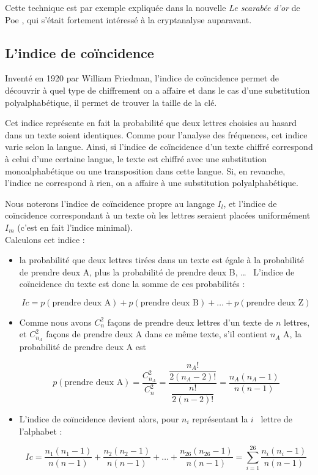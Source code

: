 Cette technique est par exemple expliquée dans la nouvelle
\emph{Le scarabée d'or} de Poe \cite{Poe}, qui s'était fortement 
intéressé à la cryptanalyse auparavant.


\subsection{L'indice de coïncidence}
Inventé en 1920 par William Friedman, l'indice de coïncidence
permet de découvrir à quel type de chiffrement on a affaire 
et dans le cas d'une
substitution polyalphabétique, il permet de trouver la taille de
la clé.

Cet indice représente en fait la probabilité que deux lettres
choisies au hasard dans un texte soient identiques. Comme pour
l'analyse des fréquences, cet indice varie selon la langue.
Ainsi, si l'indice de coïncidence d'un texte chiffré correspond à
celui d'une certaine langue, le texte est chiffré avec une
substitution monoalphabétique ou une transposition dans cette 
langue. Si, en revanche, l'indice ne correspond à rien, on a affaire 
à une substitution polyalphabétique.

Nous noterons l'indice de coïncidence propre au langage $I_l$, et
l'indice de coïncidence correspondant à un texte où les lettres
seraient placées uniformément $I_m$ (c'est en fait l'indice
minimal). 
\\

Calculons cet indice :
\begin{itemize}
  \item la probabilité que deux lettres tirées dans un texte est
égale à la probabilité de prendre deux A, plus la probabilité de
prendre deux B, \dots~ L'indice de coïncidence du texte est donc la
somme de ces probabilités :
  \begin{center}
    \[ Ic = p(\mbox{prendre deux A}) + p(\mbox{prendre deux B}) +
\dots + p(\mbox{prendre deux Z}) \]
  \end{center}
  \item Comme nous avons $C_{n}^2$ façons de prendre deux lettres
d'un texte de $n$ lettres, et $C_{n_A}^2$ façons de prendre deux A
dans ce même texte, s'il contient $n_A$ A, la probabilité de prendre 
deux A est
  \begin{center}
    \[ p(\mbox{prendre deux A}) = \dfrac{C_{n_A}^2}{C_{n}^2} =
\dfrac{\dfrac{n_A!}{2 (n_A - 2)!}}{\dfrac{n!}{2 (n - 2)!}} = 
\dfrac{n_A (n_A - 1)}{n (n - 1)} \]
  \end{center}
  \item L'indice de coïncidence devient alors, pour $n_i$
représentant la $i$\ieme~ lettre de l'alphabet :
  \begin{center}
    \[ Ic = \frac{n_1 (n_1 - 1)}{n (n - 1)} + \frac{n_2 (n_2 - 1)}{n
(n - 1)} + \dots + \frac{n_{26} (n_{26} - 1)}{n (n - 1)} = \sum_{i
= 1}^{26} \frac{n_i (n_i - 1)}{n (n - 1)} \] 
  \end{center}
\end{itemize}

